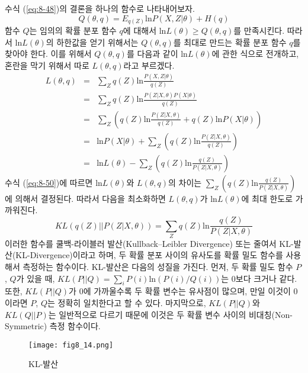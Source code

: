 \documentclass[a4paper]{oblivoir}
\begin{document}
수식 (\ref{eq:8-48})의 결론을 하나의 함수로 나타내어보자.
\begin{equation}
Q(\theta, q) = E_{q(Z)} \textrm{ln} P(X, Z|\theta) + H(q) \label{eq:8-49}
\end{equation}
함수 $Q$는 임의의 확률 분포 함수 $q$에 대해서 $\textrm{ln} L(\theta) \geq Q(\theta, q)$를 만족시킨다. 따라서 $\textrm{ln} L(\theta)$의 하한값을 얻기 위해서는 $Q(\theta, q)$를 최대로 만드는 확률 분포 함수 $q$를 찾아야 한다. 이를 위해서 $Q(\theta, q)$를 다음과 같이 $\textrm{ln} L(\theta)$에 관한 식으로 전개하고, 혼란을 막기 위해서 따로 $L(\theta, q)$라고 부르겠다. 
\begin{eqnarray}
L(\theta, q) & = & \sum_{Z} q(Z) \textrm{ln} \frac{P(X, Z|\theta)}{q(Z)} \nonumber  \\
& = & \sum_{Z} q(Z) \textrm{ln} \frac{P(Z|X,\theta) P(X|\theta)}{q(Z)} \nonumber  \\
& = & \sum_{Z} (q(Z) \textrm{ln} \frac{P(Z|X,\theta)}{q(Z)} + q(Z) \textrm{ln} P(X|\theta))  \nonumber  \\
& = & \textrm{ln} P(X|\theta) + \sum_{Z} (q(Z) \textrm{ln} \frac{P(Z|X,\theta)}{q(Z)}) \nonumber  \\
& = & \textrm{ln} L(\theta) - \sum_{Z} (q(Z) \textrm{ln} \frac{q(Z)}{P(Z|X,\theta)}) \label{eq:8-50} 
\end{eqnarray}
수식 (\ref{eq:8-50})에 따르면 $\textrm{ln} L(\theta)$와 $L(\theta, q)$의 차이는 $\sum_{Z} (q(Z) \textrm{ln} \frac{q(Z)}{P(Z|X,\theta)})$에 의해서 결정된다. 따라서 다음을 최소화하면 $L(\theta, q)$가 $\textrm{ln} L(\theta)$에 최대 한도로 가까워진다. 
\begin{equation}
KL(q(Z) || P(Z|X,\theta)) = \sum_{Z} q(Z) \textrm{ln} \frac{q(Z)}{P(Z|X,\theta)} \label{eq:8-51}
\end{equation}
이러한 함수를 쿨백-라이블러 발산(Kullback–Leibler Divergence) 또는 줄여서 KL-발산(KL-Divergence)이라고 하며, 두 확률 분포 사이의 유사도를 확률 밀도 함수를 사용해서 측정하는 함수이다. KL-발산은 다음의 성질을 가진다. 먼저, 두 확률 밀도 함수 $P$, $Q$가 있을 때, $KL(P || Q) = \sum_{i} P(i) \textrm{ln} (P(i) / Q(i))$는 0보다 크거나 같다. 또한, $KL(P || Q)$가 0에 가까울수록 두 확률 변수는 유사점이 많으며, 만일 이것이 0이라면 $P$, $Q$는 정확히 일치한다고 할 수 있다. 마지막으로, $KL(P || Q)$와 $KL(Q || P)$는 일반적으로 다르기 때문에 이것은 두 확률 변수 사이의 비대칭(Non-Symmetric) 측정 함수이다. \\     

\begin{figure}[ht] \centering 
\texttt{[image: fig8\_14.png]} 
\caption{KL-발산}
\label{fig:8-14}
\end{figure}
\end{document}
